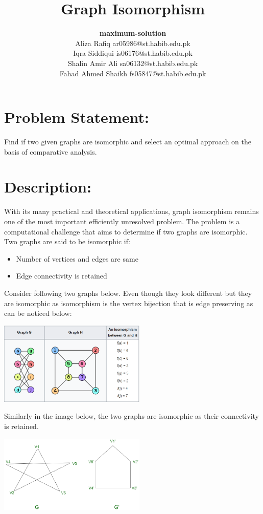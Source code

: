 \documentclass[a4paper]{article}
\title{Graph Isomorphism}
\author{\textbf{maximum-solution} \\ Aliza Rafiq ar05986@st.habib.edu.pk \\ Iqra Siddiqui is06176@st.habib.edu.pk \\ Shalin Amir Ali sa06132@st.habib.edu.pk \\Fahad Ahmed Shaikh fs05847@st.habib.edu.pk \\}
\date{}
\begin{document}
\maketitle

\section{Problem Statement:}
Find if two given graphs are isomorphic and select an optimal approach on the basis of comparative analysis.
\section{Description:}
With its many practical and theoretical applications, graph isomorphism remains one of the most important efficiently unresolved problem. The problem is a computational challenge that aims to determine if two graphs are isomorphic. Two graphs are said to be isomorphic if:\\
\begin{itemize}
\item Number of vertices and edges are same\\
\item Edge connectivity is retained\\
\end{itemize}
Consider following two graphs below. Even though they look different but they are isomorphic as isomorphism is the vertex bijection that is edge preserving as can be noticed below:\\
\begin{center}
\includegraphics[width=7cm]{images/graphisomorphic.png}\\
\end{center}
Similarly in the image below, the two graphs are isomorphic as their connectivity is retained. \\
\begin{center}
\includegraphics[width=7cm]{images/isomorphism.png}\\
\end{center}
\end{document}
